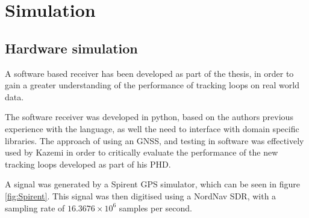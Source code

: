 \begin{comment}
The results of this analysis can be seen in figure \ref{fig:RootLocus}, from this analysis of the root locus, we can determine  that the system is stable, for values of the \ac{VCO} gain which are larger than 0.38. This is an important result, as intuitively, increasing the gain will typically make a system unstable. However, this result demonstrates the value of Root Locus analysis for evaluating the stability of a higher order system.

In order to verify the implementation of the analog model was correct, a second graphical model was constructed in CircuitLab. This model can be seen in figure \ref{fig:gpsLoopModel}. By adjusting the VCO gain, the threshold between stable and unstable behaviour for a step input was confirmed to be 0.38. The results from this experiment can be seen in figures \ref{fig:Stable} and \ref{fig:Unstable}

Additionally, this model confirmed that the current\ac{NAMURU} architecture is able to integrate up velocity and acceleration however it is vulnerable to Jerk. This was assessed by applying ramp and parabolic inputs to the input, and comparing to the output.
\end{comment}

\section{Simulation}

\subsection{Hardware simulation}
A software based receiver has been developed as part of the thesis, in order to gain a greater understanding of the performance of tracking loops on real world data. 

The software receiver was developed in python, based on the authors previous experience with the language, as well the need to interface with domain specific libraries. 
The approach of using an \ac{GNSS}, and testing in software was effectively used by Kazemi \cite{KazemiPHD} in order to critically evaluate the performance of the new tracking loops developed as part of his PHD.

A signal was generated by a Spirent \ac{GPS} simulator, which can be seen in figure \ref{fig:Spirent}. This signal was then digitised using a NordNav \ac{SDR}, with a sampling rate of $16.3676 \times 10^6$ samples per second. 

